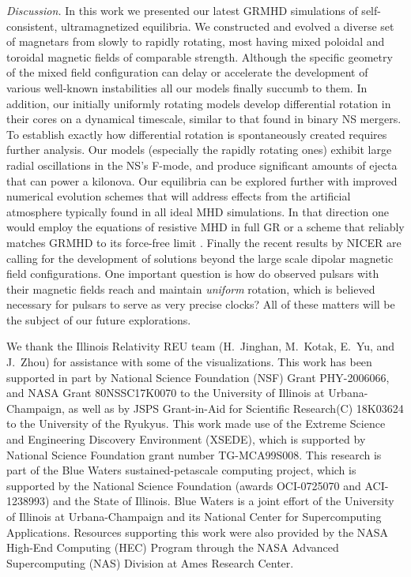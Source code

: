 \documentclass[twocolumn,superscriptaddress,showpacs,prl,aps,amsmath,amssymb,nofootinbib]{revtex4-1}
\begin{document}
\textit{Discussion.}\textemdash
In this work we presented our latest GRMHD simulations of self-consistent,
ultramagnetized equilibria. We constructed and evolved a diverse set of
magnetars from slowly to rapidly rotating, most having mixed poloidal and toroidal
magnetic fields of comparable strength.  Although the specific geometry of the
mixed field configuration can delay or accelerate the development of various
well-known instabilities \cite{Markey1973,Tayler1973,Wright1973} all our models
finally succumb to them. In addition, our initially uniformly rotating models
develop differential rotation in their cores on a dynamical timescale, similar to
that found in binary NS mergers. To establish exactly how differential rotation
is spontaneously created requires further analysis.  Our models (especially the
rapidly rotating ones) exhibit large radial oscillations in the NS's  F-mode,
and produce significant amounts of ejecta that can power a kilonova. Our
equilibria can be explored further with improved numerical evolution schemes
that will address effects from the artificial atmosphere typically found in all
ideal MHD simulations. In that direction one would employ the equations of
resistive MHD in full GR
\cite{Palenzuela:2008sf,Palenzuela:2012my,Dionysopoulou:2012zv,Dionysopoulou:2015tda} or a scheme
that reliably matches GRMHD to its force-free limit \cite{Paschalidis:2013gma}.
Finally the recent results by NICER \cite{Miller_2019,Riley:2019} are calling
for the development of solutions beyond the large scale dipolar magnetic field
configurations. One important question is how do observed pulsars with their
magnetic fields reach and maintain \textit{uniform} rotation, which is believed
necessary for pulsars to serve as very precise clocks? All of these matters will be the
subject of our future explorations.



\acknowledgements
We thank the Illinois Relativity REU team (H.~Jinghan, M.~Kotak, E.~Yu, and J.~Zhou) for
assistance with some of the visualizations. This work has been supported in part by National Science
Foundation (NSF) Grant PHY-2006066, and NASA Grant 80NSSC17K0070 to the University of
Illinois at Urbana-Champaign, as well as by JSPS Grant-in-Aid for Scientific Research(C) 18K03624 to the 
University of the Ryukyus. This work made use of the Extreme Science and Engineering Discovery
Environment (XSEDE), which is supported by National Science Foundation grant number TG-MCA99S008. This
research is part of the Blue Waters sustained-petascale computing project, which is supported by the
National Science Foundation (awards OCI-0725070 and ACI-1238993) and the State of Illinois. Blue Waters
is a joint effort of the University of Illinois at Urbana-Champaign and its National Center
for Supercomputing Applications. Resources supporting this work were also provided by the NASA High-End
Computing (HEC) Program through the NASA Advanced Supercomputing (NAS) Division at Ames Research Center.
\end{document}
